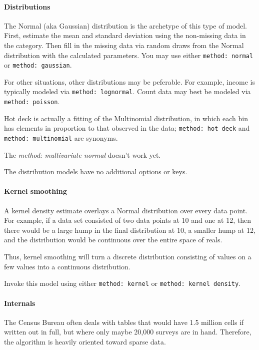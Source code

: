 \documentclass{article}
\begin{document}
\paragraph{Distributions} The Normal (aka Gaussian) distribution is the archetype of this
type of model. First, estimate the mean and standard deviation using the non-missing data
in the category. Then fill in the missing data via random draws from the Normal
distribution with the calculated parameters. You may use either {\tt method: normal} or
{\tt method: gaussian}.

For other situations, other distributions may be peferable. For example, income is
typically modeled via {\tt method: lognormal}. Count data may best be modeled via {\tt
method: poisson}.

Hot deck is actually a fitting of the Multinomial distribution, in which each bin has
elements in proportion to that observed in the data; {\tt method: hot deck} and {\tt
method: multinomial} are synonyms.

The {\em method: multivariate normal} doesn't work yet.

The distribution models have no additional options or keys.

\paragraph{Kernel smoothing} A kernel density estimate overlays a Normal distribution over
every data point. For example, if a data set consisted of two data points at 10 and one at
12, then there would be a large hump in the final distribution at 10, a smaller hump at
12, and the distribution would be continuous over the entire space of reals.

Thus, kernel smoothing will turn a discrete distribution consisting of values on a
few values into a continuous distribution.

Invoke this model using either {\tt method: kernel} or {\tt method: kernel density}.


\paragraph{Internals}
The Census Bureau often deals with tables that would have 1.5 million cells if written
out in full, but where only maybe 20,000 surveys are in hand. Therefore, the algorithm
is heavily oriented toward sparse data.
\end{document}
